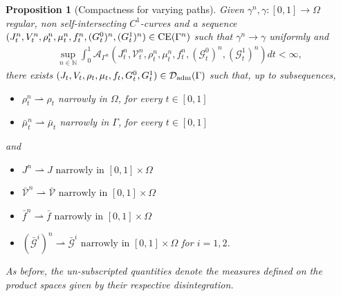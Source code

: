 \documentclass{article}
\def\calA{{\mathcal A}} \def\calB{{\mathcal B}} \def\calC{{\mathcal C}}
\newtheorem{proposition}[theorem]{Proposition}
\begin{document}
\begin{proposition}[Compactness for varying paths]
\label{thm:compactVarPath}
Given $\gamma^n,\gamma : [0,1] \rightarrow \Omega$ regular, non self-intersecting $C^1$-curves and a sequence $(J_t^n,V_t^n,\rho_t^n,\mu_t^n,f_t^n,(G_t^0)^n,(G_t^1)^n) \in {\rm CE}(\Gamma^n)$ such that $\gamma^n \rightarrow \gamma$ uniformly and
\begin{align*}
    \sup_{n\in \mathbb{N}} \int_0^1 \calA_{\Gamma^n}( J_t^n,\mathcal{V}_t^n,\rho_t^n,\mu_t^n,f_t^n,(\mathcal{G}^0_t)^n,(\mathcal{G}_t^1)^n)dt < \infty,
\end{align*}
there exists $(J_t,V_t,\rho_t,\mu_t,f_t, G_t^0,G_t^1) \in \mathcal{D}_{\rm adm}(\Gamma)
$ such that, up to subsequences, 
\begin{itemize}
    \item[i)] $\rho^n_t \rightharpoonup \rho_t$ narrowly in $\Omega$, for every $t \in [0,1]$
    \item[ii)]  $\bar \mu^n_t  \rightharpoonup \bar \mu_t$ narrowly in $\Gamma$, for every  $t \in [0,1]$
\end{itemize} 
and 
\begin{itemize}
    \item[iii)] $J^n \rightharpoonup J \text{ narrowly in } [0,1] \times \Omega$
    \item[iv)] $\bar{\mathcal{V}}^n  \rightharpoonup \bar{\mathcal{V}}  \text{ narrowly in } [0,1] \times \Omega$
    \item[v)] $\bar f^n  \rightharpoonup \bar f  \text{ narrowly in } [0,1] \times \Omega$
    \item[vi)] $( \bar{\mathcal{G}}^i)^n \rightharpoonup  \bar{\mathcal{G}}^i \text{ narrowly in } [0,1] \times \Omega$ for $i=1,2$.
\end{itemize}
As before, the un-subscripted quantities denote the measures defined on the product spaces given by their respective disintegration.
\end{proposition}
\end{document}
